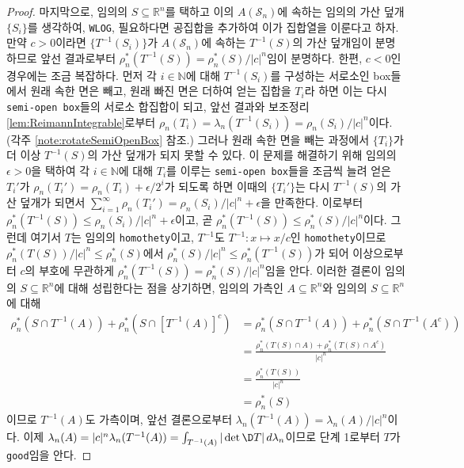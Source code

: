\begin{proof}
    마지막으로, 임의의 $S\subseteq\mathbb{R}^n$를 택하고 이의 $A(\mathcal{S}_n)$에 속하는 임의의 가산 덮개 $\{S_i\}$를 생각하여, \texttt{WLOG}, 필요하다면 공집합을 추가하여 이가 집합열을 이룬다고 하자. 만약 $c>0$이라면 $\{T^{-1}(S_i)\}$가 $A(\mathcal{S}_n)$에 속하는 $T^{-1}(S)$의 가산 덮개임이 분명하므로 앞선 결과로부터 $\rho_n^*(T^{-1}(S))=\rho_n^*(S)/|c|^n$임이 분명하다. 한편, $c<0$인 경우에는 조금 복잡하다. 먼저 각 $i\in\mathbb{N}$에 대해 $T^{-1}(S_i)$를 구성하는 서로소인 box들에서 원래 속한 면은 빼고, 원래 빠진 면은 더하여 얻는 집합을 $T_i$라 하면 이는 다시 \texttt{semi-open box}들의 서로소 합집합이 되고, 앞선 결과와 보조정리 \ref{lem:ReimannIntegrable}로부터 $\rho_n(T_i)=\lambda_n(T^{-1}(S_i))=\rho_n(S_i)/|c|^n$이다. (각주 \ref{note:rotateSemiOpenBox} 참조.) 그러나 원래 속한 면을 빼는 과정에서 $\{T_i\}$가 더 이상 $T^{-1}(S)$의 가산 덮개가 되지 못할 수 있다. 이 문제를 해결하기 위해 임의의 $\epsilon>0$을 택하여 각 $i\in\mathbb{N}$에 대해 $T_i$를 이루는 \texttt{semi-open box}들을 조금씩 늘려 얻은 $T_i'$가 $\rho_n(T_i')=\rho_n(T_i)+\epsilon/2^i$가 되도록 하면 이때의 $\{T_i'\}$는 다시 $T^{-1}(S)$의 가산 덮개가 되면서 $\sum_{i=1}^\infty\rho_n(T_i')=\rho_n(S_i)/|c|^n+\epsilon$을 만족한다. 이로부터 $\rho_n^*(T^{-1}(S))\leq\rho_n(S_i)/|c|^n+\epsilon$이고, 곧 $\rho_n^*(T^{-1}(S))\leq\rho_n^*(S)/|c|^n$이다. 그런데 여기서 $T$는 임의의 \texttt{homothety}이고, $T^{-1}$도 $T^{-1}:x\mapsto x/c$인 \texttt{homothety}이므로 $\rho_n^*(T(S))/|c|^n\leq\rho_n^*(S)$에서 $\rho_n^*(S)/|c|^n\leq\rho_n^*(T^{-1}(S))$가 되어 이상으로부터 $c$의 부호에 무관하게 $\rho_n^*(T^{-1}(S))=\rho_n^*(S)/|c|^n$임을 안다. 이러한 결론이 임의의 $S\subseteq\mathbb{R}^n$에 대해 성립한다는 점을 상기하면, 임의의 가측인 $A\subseteq\mathbb{R}^n$와 임의의 $S\subseteq\mathbb{R}^n$에 대해
    \begin{align*}
        \rho_n^*(S\cap T^{-1}(A))+\rho_n^*(S\cap [T^{-1}(A)]^c)&=\rho_n^*(S\cap T^{-1}(A))+\rho_n^*(S\cap T^{-1}(A^c))\\
        &=\frac{\rho_n^*(T(S)\cap A)+\rho_n^*(T(S)\cap A^c)}{|c|^n}\\
        &=\frac{\rho_n^*(T(S))}{|c|^n}\\
        &=\rho_n^*(S)
    \end{align*}
    이므로 $T^{-1}(A)$도 가측이며, 앞선 결론으로부터 $\lambda_n(T^{-1}(A))=\lambda_n(A)/|c|^n$이다. 이제 $\lambda_n(A)=|c|^n\lambda_n(T^{-1}(A))=\int_{T^{-1}(A)}|\det\D T|\,d\lambda_n$이므로 단계 1로부터 $T$가 \texttt{good}임을 안다.


\end{proof}
